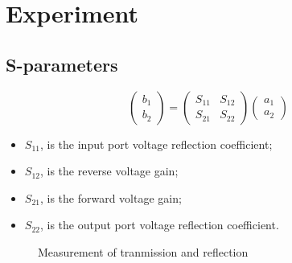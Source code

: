 
\section{Experiment}

\subsection{S-parameters}
\label{sec:s-parameters}

\begin{equation}
  \begin{pmatrix}
    b_{1}\\b_2
  \end{pmatrix} = \begin{pmatrix} S_{11} & S_{12} \\ S_{21} & S_{22}
  \end{pmatrix}
  \begin{pmatrix}
    a_{1} \\ a_2
  \end{pmatrix}
\end{equation}

\begin{itemize}
\item $S_{11}$, is the input port voltage reflection coefficient;
\item $S_{12}$, is the reverse voltage gain;
\item $S_{21}$, is the forward voltage gain;
\item $S_{22}$, is the output port voltage reflection coefficient.
\end{itemize}

\begin{figure}[h]
  \centering {}
  \caption{\small Measurement of tranmission and reflection\label{fig:s_parameters}}
\end{figure}

